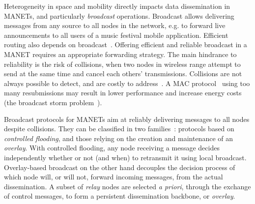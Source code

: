 
Heterogeneity in space and mobility directly impacts data dissemination in MANETs, and particularly \emph{broadcast} operations.
Broadcast allows delivering messages from any source to all nodes in the network, e.g. to forward live announcements to all users of a music festival mobile application.
Efficient routing also depends on broadcast~\cite{overview_adhoc_networks}.
Offering efficient and reliable broadcast in a MANET requires an appropriate forwarding strategy.
The main hindrance to reliability is the risk of collisions, when two nodes in wireless range attempt to send at the same time and cancel each others' transmissions.
Collisions are not always possible to detect, and are costly to address~\cite{hidden-terminal-problem}.
A MAC protocol~\cite{ieee1997wireless} using too many resubmissions may result in lower performance and increase energy costs (the broadcast storm problem~\cite{BroadcastStormProblem}).

Broadcast protocols for MANETs aim at reliably delivering messages to all nodes despite collisions. They can be classified in two families~\cite{ruiz2015survey}: protocols based on \emph{controlled flooding}, and those relying on the creation and maintenance of an \emph{overlay}.
%
With controlled flooding, any node receiving a message decides independently whether or not (and when) to retransmit it using local broadcast. %
%
Overlay-based broadcast on the other hand decouples the decision process of which node will, or will not, forward incoming messages, from the actual dissemination.
A subset of \emph{relay} nodes are selected \emph{a priori}, through the exchange of control messages, to form a persistent dissemination backbone, or \emph{overlay}.


